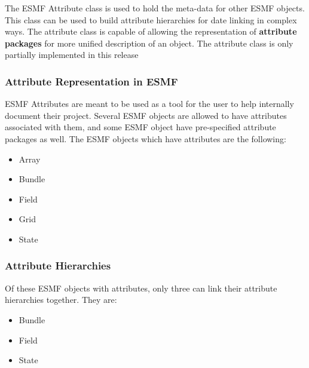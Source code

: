 %

The ESMF Attribute class is used to hold the meta-data for other ESMF objects.  This class can be used to build attribute hierarchies for date linking in complex ways.  The attribute class is capable of allowing the representation of {\bf attribute packages} for more unified description of an object.  The attribute class is only partially implemented in this release 

\subsubsection{Attribute Representation in ESMF}

ESMF Attributes are meant to be used as a tool for the user to help internally document their project.   Several ESMF objects are allowed to have attributes associated with them, and some ESMF object have pre-specified attribute packages as well.  The ESMF objects which have attributes are the following:

\begin{itemize}
\item Array
\item Bundle
\item Field
\item Grid
\item State
\end{itemize}

\subsubsection{Attribute Hierarchies}

Of these ESMF objects with attributes, only three can link their attribute hierarchies together.  They are:

\begin{itemize}
\item Bundle
\item Field
\item State
\end{itemize}

